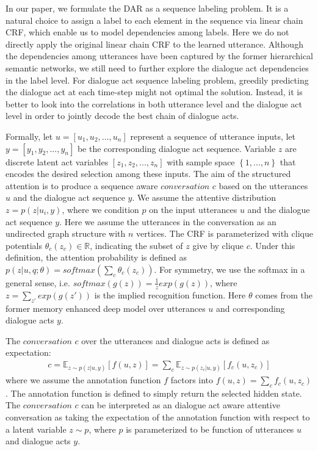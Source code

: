 \documentclass[sigconf]{acmart}
\begin{document}
In our paper, we formulate the DAR as a sequence labeling problem. It is a natural choice to assign a label to each element in the sequence via linear chain CRF, which enable us to model dependencies among labels. Here we do not directly apply the original linear chain CRF to the learned utterance. Although the dependencies among utterances have been captured by the former hierarchical semantic networks, we still need to further explore the dialogue act dependencies in the label level. For dialogue act sequence labeling problem, greedily predicting the dialogue act at each time-step might not optimal the solution. Instead, it is better to look into the correlations in both utterance level and the dialogue act level in order to jointly decode the best chain of dialogue acts.

Formally, let $u=\left[u_1,u_2,...,u_n \right] $ represent a sequence of utterance inputs, let $y=\left[y_1,y_2,...,y_n\right]$ be the corresponding dialogue act sequence. Variable $z$ are discrete latent act variables $\left[ z_1,z_2,...,z_n\right] $ with sample space $ \left\lbrace 1,...,n\right\rbrace $ that encodes the desired selection among these inputs. The aim of the structured attention is to produce a sequence aware $conversation$ $c$ based on the utterances $u$ and the dialogue act sequence $y$. We assume the attentive distribution $z=p(z|u_i,y)$, where we condition $p$ on the input utterances $u$ and the dialogue act sequence $y$.  Here we assume the utterances in the conversation as an undirected graph structure with $n$ vertices. The CRF is parameterized with clique potentials $\theta_c(z_c) \in \mathbb{R}$, indicating the subset of $z$ give by clique $c$. Under this definition, the attention probability is defined as $p(z|u,q;\theta)=softmax(\sum_c\theta_c(z_c))$. For symmetry, we use the softmax in a general sense, i.e. $softmax(g(z))=\frac{1}{z}exp(g(z))$, where $z=\sum_{z'}exp(g(z'))$ is the implied recognition function. Here $\theta$ comes from the former memory enhanced deep model over utterances $u$ and corresponding dialogue acts $y$. 

The $conversation$ $c$ over the utterances and dialogue acts is defined as expectation:
\begin{align*}
c=\mathbb{E}_{z\sim p(z|u,y)}[f(u,z)]=\sum_c \mathbb{E}_{z\sim p(z_c|u,y)}[f_c(u,z_c)] \tag{7}
\end{align*}
where we assume the annotation function $f$ factors into $f(u,z)=\sum_c f_c(u,z_c)$. The annotation function is defined to simply return the selected hidden state. The $conversation$ $c$ can be interpreted as an dialogue act aware attentive conversation as taking the expectation of the annotation function with respect to a latent variable $z\sim p$, where $p$ is parameterized to be function of utterances $u$ and dialogue acts $y$.
 
\end{document}
